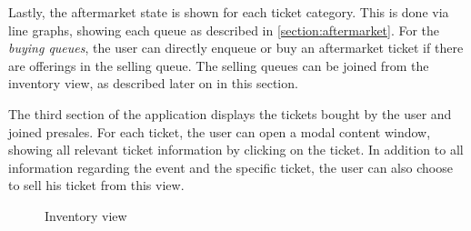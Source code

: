 Lastly, the aftermarket state is shown for each ticket category. This is done via line graphs, showing each queue as described in \ref{section:aftermarket}. For the \textit{buying queues}, the user can directly enqueue or buy an aftermarket ticket if there are offerings in the selling queue. The selling queues can be joined from the inventory view, as described later on in this section.

The third section of the application displays the tickets bought by the user and joined presales. For each ticket, the user can open a modal content window, showing all relevant ticket information by clicking on the ticket. In addition to all information regarding the event and the specific ticket, the user can also choose to sell his ticket from this view.
\begin{figure}[!tbp]
  \centering
  \hfill
  \caption{Inventory view}
  \label{img:inventory}
\end{figure}

